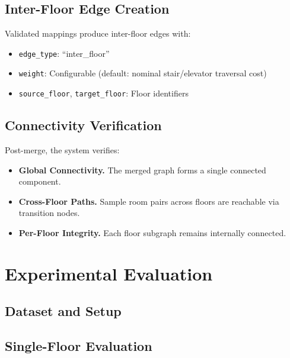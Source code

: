 \documentclass[manuscript,screen,review]{acmart}
\begin{document}
\subsection{Inter-Floor Edge Creation}
\label{subsec:interfloor_edges}

Validated mappings produce inter-floor edges with:
\begin{itemize}
    \item \texttt{edge\_type}: ``inter\_floor''
    \item \texttt{weight}: Configurable (default: nominal stair/elevator traversal cost)
    \item \texttt{source\_floor}, \texttt{target\_floor}: Floor identifiers
\end{itemize}

\subsection{Connectivity Verification}
\label{subsec:verification}

Post-merge, the system verifies:
\begin{itemize}
    \item \textbf{Global Connectivity.} The merged graph forms a single connected component.
    \item \textbf{Cross-Floor Paths.} Sample room pairs across floors are reachable via transition nodes.
    \item \textbf{Per-Floor Integrity.} Each floor subgraph remains internally connected.
\end{itemize}

\section{Experimental Evaluation}
\label{sec:experiments}

\subsection{Dataset and Setup}
\label{subsec:dataset}


\subsection{Single-Floor Evaluation}
\label{subsec:single_eval}
\end{document}
